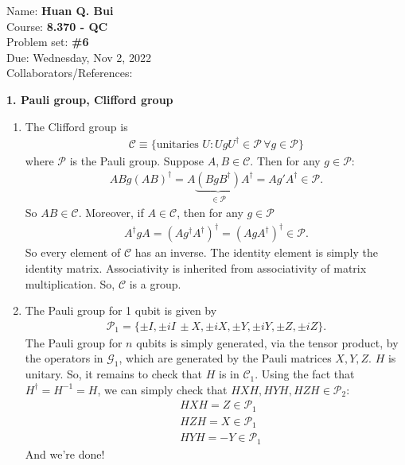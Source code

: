 \documentclass{article}
\theoremstyle{definition}
\begin{document}
\begin{framed}
\noindent Name: \textbf{Huan Q. Bui}\\
Course: \textbf{8.370 - QC}\\
Problem set: \textbf{\#6}\\
Due: Wednesday, Nov 2, 2022\\
Collaborators/References: 
\end{framed}


\noindent \textbf{1. Pauli group, Clifford group} 

\begin{enumerate}[label=(\alph*)]
	\item The Clifford group is 
	\begin{align*}
		\mathcal{C} \equiv \{ \text{unitaries } U : U g U^\dagger \in \mathcal{P}\, \forall g \in \mathcal{P}     \}
	\end{align*}
where $\mathcal{P}$ is the Pauli group. Suppose $A,B\in \mathcal{C}$. Then for any $g\in \mathcal{P}$:
\begin{align*}
	AB g (AB)^\dagger =  A \underbrace{ (BgB^\dagger)}_{\in \mathcal{P}} A^\dagger= A g' A^\dagger \in \mathcal{P}.
\end{align*}
So $AB\in \mathcal{C}$. Moreover, if $A\in \mathcal{C}$, then for any $g\in \mathcal{P}$
\begin{align*}
	A^\dagger g A = (A g^\dagger A^\dagger)^\dagger = (  A g A^\dagger)^\dagger \in \mathcal{P}.
\end{align*}
So every element of $\mathcal{C}$ has an inverse. The identity element is simply the identity matrix. Associativity is inherited from associativity of matrix multiplication. So, $\mathcal{C}$ is a group. 
	
	\item The Pauli group for 1 qubit is given by 
	\begin{align*}
		\mathcal{P}_1 = \{ \pm I, \pm iI\,\pm X, \pm iX, \pm Y, \pm i Y, \pm Z, \pm iZ \}.
	\end{align*}
	The Pauli group for $n$ qubits is simply generated, via the tensor product, by the operators in $\mathcal{G}_1$, which are generated by the Pauli matrices $X,Y,Z$. $H$ is unitary. So, it remains to check that $H$ is in $\mathcal{C}_1$. Using the fact that $H^\dagger = H^{-1} = H$, we can simply check that $HXH, HYH, HZH \in \mathcal{P}_2$:
	\begin{align*}
		&HXH = Z \in \mathcal{P}_1 \\
		&HZH = X \in \mathcal{P}_1 \\
		&HYH = -Y \in \mathcal{P}_1
	\end{align*}
	And we're done!
	

\end{enumerate}
\end{document}
